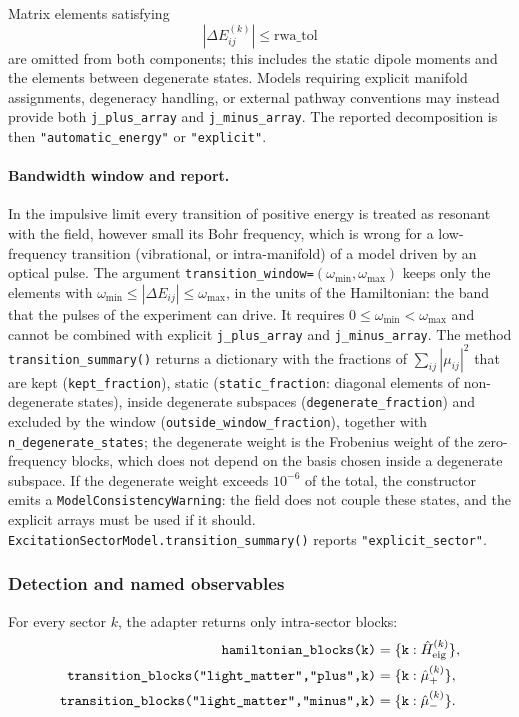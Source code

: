 \documentclass[11pt]{article}
\begin{document}
Matrix elements satisfying
\begin{equation}
    |\Delta E_{ij}^{(k)}| \leq \text{rwa\_tol}
\end{equation}
are omitted from both components; this includes the static dipole moments and the elements between degenerate states. Models requiring explicit manifold assignments, degeneracy handling, or external pathway conventions may instead provide both \texttt{j\_plus\_array} and \texttt{j\_minus\_array}. The reported decomposition is then \texttt{"automatic\_energy"} or \texttt{"explicit"}.

\paragraph{Bandwidth window and report.}
In the impulsive limit every transition of positive energy is treated as resonant with the field, however small its Bohr frequency, which is wrong for a low-frequency transition (vibrational, or intra-manifold) of a model driven by an optical pulse. The argument \texttt{transition\_window=}$(\omega_{\min},\omega_{\max})$ keeps only the elements with $\omega_{\min}\leq|\Delta E_{ij}|\leq\omega_{\max}$, in the units of the Hamiltonian: the band that the pulses of the experiment can drive. It requires $0\leq\omega_{\min}<\omega_{\max}$ and cannot be combined with explicit \texttt{j\_plus\_array} and \texttt{j\_minus\_array}. The method \texttt{transition\_summary()} returns a dictionary with the fractions of $\sum_{ij}|\mu_{ij}|^2$ that are kept (\texttt{kept\_fraction}), static (\texttt{static\_fraction}: diagonal elements of non-degenerate states), inside degenerate subspaces (\texttt{degenerate\_fraction}) and excluded by the window (\texttt{outside\_window\_fraction}), together with \texttt{n\_degenerate\_states}; the degenerate weight is the Frobenius weight of the zero-frequency blocks, which does not depend on the basis chosen inside a degenerate subspace. If the degenerate weight exceeds $10^{-6}$ of the total, the constructor emits a \texttt{ModelConsistencyWarning}: the field does not couple these states, and the explicit arrays must be used if it should. \texttt{ExcitationSectorModel.transition\_summary()} reports \texttt{"explicit\_sector"}.

\subsubsection{Detection and named observables}

For every sector $k$, the adapter returns only intra-sector blocks:
\begin{align}
\texttt{hamiltonian\_blocks(k)}
&=
\{\texttt{k}:\hat{H}_{\mathrm{eig}}^{(k)}\},\\
\texttt{transition\_blocks(\text{"light\_matter"},\text{"plus"},k)}
&=
\{\texttt{k}:\hat{\mu}_{+}^{(k)}\},\\
\texttt{transition\_blocks(\text{"light\_matter"},\text{"minus"},k)}
&=
\{\texttt{k}:\hat{\mu}_{-}^{(k)}\}.
\end{align}
\end{document}
